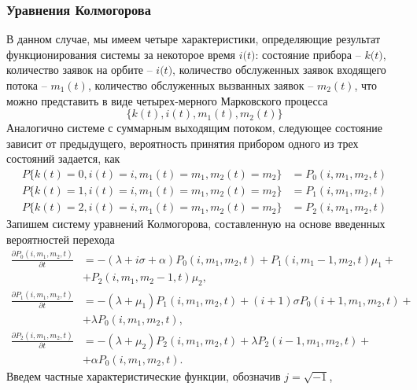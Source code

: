 \subsubsection{Уравнения Колмогорова}
В данном случае, мы имеем четыре характеристики, определяющие результат функционирования системы за некоторое время $\textit{i(t)}$: состояние прибора – $\textit{k(t)}$, количество заявок на орбите – $\textit{i(t)}$, количество обслуженных заявок входящего потока – $m_{1}(t)$, количество обслуженных вызванных заявок – $m_{2}(t)$,  что можно представить в виде четырех-мерного Марковского процесса
\begin{equation*}
	\{k(t),i(t),m_{1}(t),m_{2}(t)\}
\end{equation*}
Аналогично системе с суммарным выходящим потоком, следующее состояние зависит от предыдущего, вероятность принятия прибором одного из трех состояний задается, как
\begin{equation*}
	\begin{split}
		P\{k(t)=0,i(t)=i,m_{1}(t)=m_{1},m_{2}(t)=m_{2}\} &=P_{0}(i,m_{1},m_{2},t)\\
		P\{k(t)=1,i(t)=i,m_{1}(t)=m_{1},m_{2}(t)=m_{2}\} &=P_{1}(i,m_{1},m_{2},t)\\
		P\{k(t)=2,i(t)=i,m_{1}(t)=m_{1},m_{2}(t)=m_{2}\} &=P_{2}(i,m_{1},m_{2},t)
	\end{split}
\end{equation*}
Запишем систему уравнений Колмогорова, составленную на основе введенных вероятностей перехода
\begin{equation} \label{kolmogorov_equations_twodim}
	\begin{split}
		\frac{{\partial P_{0}(i,m_{1},m_{2},t)}}{{\partial t}} &= -(\lambda + i\sigma + \alpha)P_{0}(i,m_{1},m_{2},t) + P_{1}(i,m_{1}-1,m_{2},t)\mu_{1} +\\  &+ P_{2}(i,m_{1},m_{2}-1,t)\mu_{2} ,
		\\
		\frac{{\partial P_{1}(i,m_{1},m_{2},t)}}{{\partial t}} &= -(\lambda + \mu_{1})P_{1}(i,m_{1},m_{2},t) + (i+1)\sigma P_{0}(i+1,m_{1},m_{2},t) +\\ &+ \lambda  P_{0}(i,m_{1},m_{2},t),
		\\
		\frac{{\partial P_{2}(i,m_{1},m_{2},t)}}{{\partial t}} &= -(\lambda + \mu_{2})P_{2}(i,m_{1},m_{2},t) + \lambda P_{2}(i-1,m_{1},m_{2},t)  +\\ &+ \alpha  P_{0}(i,m_{1},m_{2},t).
	\end{split}
\end{equation}	
Введем частные характеристические функции, обозначив $j=\sqrt{-1}$,
